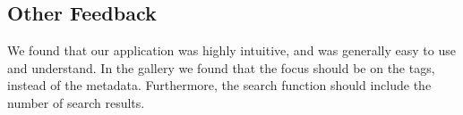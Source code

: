 \documentclass{article}
\begin{document}
\subsection{Other Feedback}
We found that our application was highly intuitive, and was generally easy to use and understand. In the gallery we found that the focus should be on the tags, instead of the metadata. Furthermore, the search function should include the number of search results.
\newpage


\end{document}
